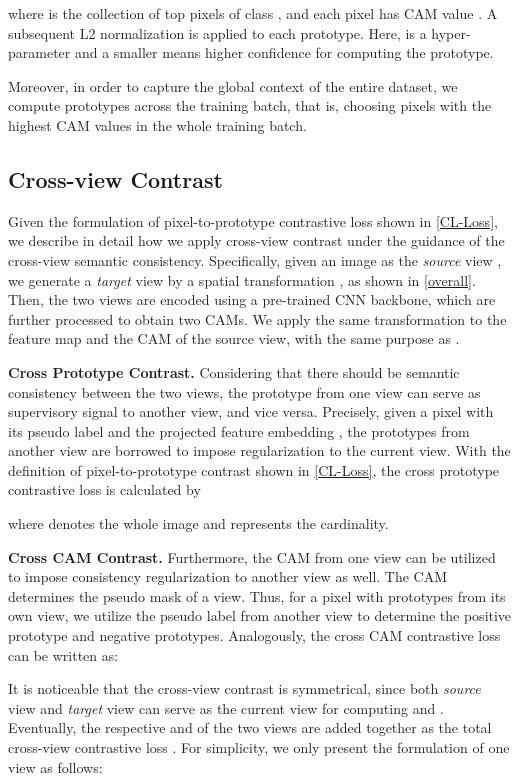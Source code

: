 \documentclass[10pt,twocolumn,letterpaper]{article}
\begin{document}
where  is the collection of top  pixels of class , and each pixel  has CAM value .
A subsequent L2 normalization is applied to each prototype. Here,  is a hyper-parameter and a smaller  means higher confidence for computing the prototype.

Moreover, in order to capture the global context of the entire dataset, we compute prototypes across the training batch, that is, choosing pixels with the highest CAM values in the whole training batch.






\subsection{Cross-view Contrast}
Given the formulation of pixel-to-prototype contrastive loss shown in \cref{CL-Loss}, we describe in detail how we apply cross-view contrast under the guidance of the cross-view semantic consistency.
Specifically, given an image as the \textit{source} view , we generate a \textit{target} view  by a spatial transformation , as shown in \cref{overall}.
Then, the two views are encoded using a pre-trained CNN backbone, which are further processed to obtain two CAMs.
We apply the same transformation  to the feature map and the CAM of the source view, with the same purpose as \cite{wang2020selfSEAM}.

\textbf{Cross Prototype Contrast.}
Considering that there should be semantic consistency between the two views, the prototype from one view can serve as supervisory signal to another view, and vice versa.
Precisely, given a pixel  with its pseudo label  and the projected feature embedding ,
the prototypes  from another view are borrowed to impose regularization to the current view.
With the definition of pixel-to-prototype contrast shown in \cref{CL-Loss}, the cross prototype contrastive loss is calculated by

where  denotes the whole image and  represents the cardinality.

\textbf{Cross CAM Contrast.}
Furthermore, the CAM from one view can be utilized to impose consistency regularization to another view as well.
The CAM determines the pseudo mask of a view.
Thus, for a pixel  with prototypes  from its own view, we utilize the pseudo label  from another view to determine the positive prototype and negative prototypes.
Analogously, the cross CAM contrastive loss can be written as:


It is noticeable that the cross-view contrast is symmetrical, since both \textit{source} view and \textit{target} view can serve as the current view for computing  and .
Eventually, the respective  and  of the two views are added together as the total cross-view contrastive loss .
For simplicity, we only present the formulation of one view as follows:
\end{document}
